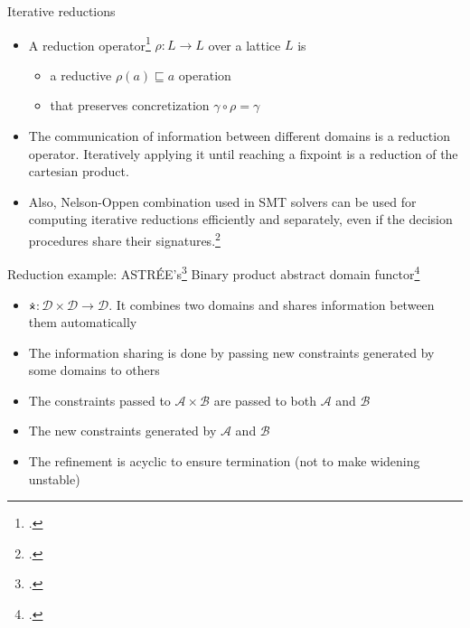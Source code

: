 \documentclass[aspectratio=169,notes]{beamer}
\begin{document}
\begin{frame}{Iterative reductions}
  \small
  \begin{itemize}[<+->]
  \item A reduction operator\footcite{cousot2011reduced} $\rho: L \to L$ over a lattice $L$ is
    \begin{itemize}
    \item a reductive $\rho(a) \sqsubseteq a$ operation
    \item  that preserves concretization $\gamma \circ \rho = \gamma$
\end{itemize}
  \item The communication of information between different domains is a reduction operator. Iteratively applying it until reaching a fixpoint is a reduction of the cartesian product.
  \item Also, Nelson-Oppen combination used in SMT solvers can be used for computing iterative reductions efficiently and separately, even if the decision procedures share their signatures.\footcite{cousot2011reduced}
  \end{itemize}
\end{frame}

\begin{frame}{Reduction example: ASTRÉE's\footcite{cousot2005astree,cousot2007varieties} Binary product abstract domain functor\footcite{cousot2006combination}}
  \begin{itemize}[<+->]
  \item $\dottimes : \mathcal{D \times D} \to \mathcal{D}$. It combines two domains and shares information between them automatically
  \item The information sharing is done by passing new constraints generated by some domains to others
  \item The constraints passed to $\mathcal{A \times B}$ are passed to both $\mathcal{A}$ and $\mathcal{B}$
  \item The new constraints generated by $\mathcal{A}$ and $\mathcal{B}$
  \item The refinement is acyclic to ensure termination (not to make widening unstable)
  \end{itemize}
\end{frame}
\end{document}
